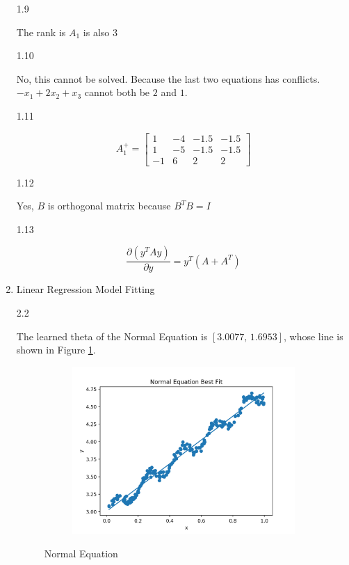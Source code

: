 \documentclass[11pt]{article}
\begin{document}
\begin{enumerate}
1.9

The rank is $A_1$ is also $3$

1.10

No, this cannot be solved. Because the last two equations has conflicts. $-x_1+2x_2+x_3$ cannot both be $2$ and $1$.

1.11

$$
A_1^+ = \begin{bmatrix}
    1 & -4 & -1.5 & -1.5 \\
    1 & -5 & -1.5 & -1.5 \\
    -1 & 6 & 2 & 2
\end{bmatrix}
$$

1.12

Yes, $B$ is orthogonal matrix because $B^TB=I$

1.13

$$ \frac{\partial (y^TAy)}{\partial y} = y^T(A + A^T)$$


\item
Linear Regression Model Fitting

2.2

The learned theta of the Normal Equation is $[3.0077,\, 1.6953]$, whose line is shown in Figure \ref{fig:ne}.

\begin{figure}[!h]
    \centering
    \begin{subfigure}[b]{0.4\linewidth}
      \includegraphics[width=\linewidth]{figures/normal.png}
    \end{subfigure}
    \caption{Normal Equation}
    \label{fig:ne}
\end{figure}


\end{enumerate}
\end{document}
